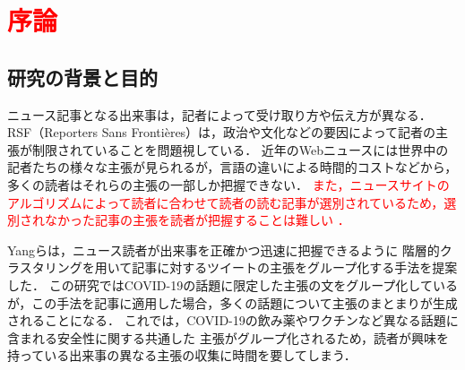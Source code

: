 \documentclass[12pt,a4j]{jreport}
\begin{document}



\chapter{\textcolor{red}{序論}}


\section{研究の背景と目的}

ニュース記事となる出来事は，記者によって受け取り方や伝え方が異なる．
RSF（Reporters Sans Frontières）は，政治や文化などの要因によって記者の主張が制限されていることを問題視している\cite{2021_world_press_freedom_index}．
近年のWebニュースには世界中の記者たちの様々な主張が見られるが，言語の違いによる時間的コストなどから，多くの読者はそれらの主張の一部しか把握できない．
\textcolor{red}{
また，ニュースサイトのアルゴリズムによって読者に合わせて読者の読む記事が選別されているため，選別されなかった記事の主張を読者が把握することは難しい
\cite{pariser_beware_nodate}\cite{bruns_filter_2019}．
}

Yangらは，ニュース読者が出来事を正確かつ迅速に把握できるように
階層的クラスタリングを用いて記事に対するツイートの主張をグループ化する手法を提案した\cite{yang_scalable_2021}．
この研究ではCOVID-19の話題に限定した主張の文をグループ化しているが，この手法を記事に適用した場合，多くの話題について主張のまとまりが生成されることになる．
これでは，COVID-19の飲み薬やワクチンなど異なる話題に含まれる安全性に関する共通した
主張がグループ化されるため，読者が興味を持っている出来事の異なる主張の収集に時間を要してしまう．
\end{document}
